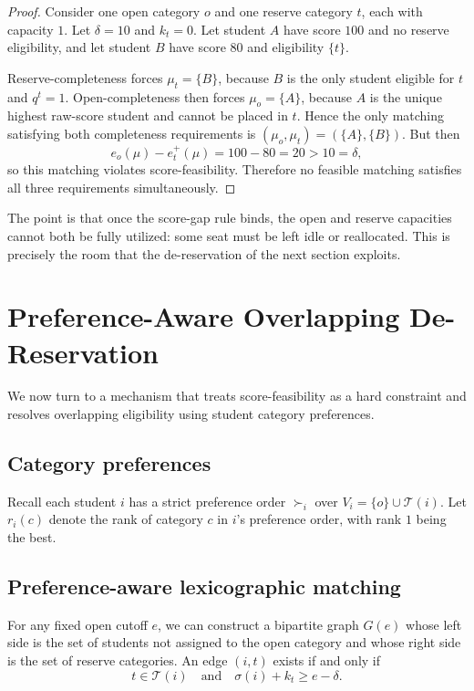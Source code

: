 \documentclass[runningheads]{llncs}
\newcommand{\T}{\mathcal{T}}
\newcommand{\1}{\mathbf{1}}
\begin{document}
\begin{proof}
Consider one open category $o$ and one reserve category $t$, each with capacity $1$. Let $\delta=10$ and $k_t=0$. Let student $A$ have score $100$ and no reserve eligibility, and let student $B$ have score $80$ and eligibility $\{t\}$.

Reserve-completeness forces $\mu_t=\{B\}$, because $B$ is the only student eligible for $t$ and $q^t=1$. Open-completeness then forces $\mu_o=\{A\}$, because $A$ is the unique highest raw-score student and cannot be placed in $t$. Hence the only matching satisfying both completeness requirements is $(\mu_o,\mu_t)=(\{A\},\{B\})$. But then
\[
e_o(\mu)-e_t^+(\mu)=100-80=20>10=\delta,
\]
so this matching violates score-feasibility. Therefore no feasible matching satisfies all three requirements simultaneously.
\end{proof}

The point is that once the score-gap rule binds, the open and reserve capacities cannot both be fully utilized: some seat must be left idle or reallocated. This is precisely the room that the de-reservation of the next section exploits.

\section{Preference-Aware Overlapping De-Reservation}

We now turn to a mechanism that treats score-feasibility as a hard constraint and resolves overlapping eligibility using student category preferences.

\subsection{Category preferences}

Recall each student $i$ has a strict preference order $\succ_i$ over $V_i=\{o\}\cup\T(i)$.
Let $r_i(c)$ denote the rank of category $c$ in $i$'s preference order, with rank $1$ being the best.

\subsection{Preference-aware lexicographic matching}

For any fixed open cutoff $e$, we can construct a bipartite graph $G(e)$ whose left side is the set of students not assigned to the open category and whose right side is the set of reserve categories. An edge $(i,t)$ exists if and only if
\[
t\in\T(i)\quad\text{and}\quad \sigma(i)+k_t\ge e-\delta.
\]
\end{document}
